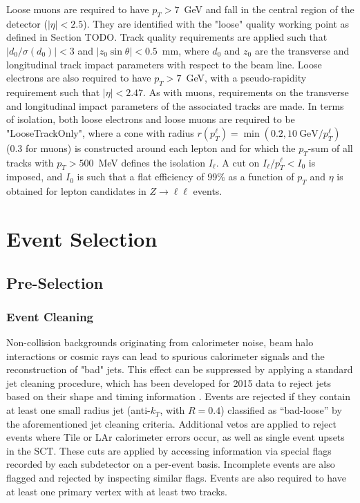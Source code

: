 Loose muons are required to have $p_{T}>7$~GeV and fall in the central region of the detector ($|\eta|<2.5$). They are identified with the "loose" quality working point as defined in Section TODO. Track quality requirements are applied such that $|d_{0}/\sigma(d_{0})|<3$ and $|z_{0}\sin\theta|<0.5$~mm, where $d_{0}$ and $z_{0}$ are the transverse and longitudinal track impact parameters with respect to the beam line. Loose electrons are also required to have $p_{T}>7$~GeV, with a pseudo-rapidity requirement such that $|\eta|<2.47$. As with muons, requirements on the transverse and longitudinal impact parameters of the associated tracks are made. In terms of isolation, both loose electrons and loose muons are required to be "LooseTrackOnly", where a cone with radius $r(p_{T}^{\ell})=\min(0.2,10~\text{GeV}/p_{T}^{\ell})$ (0.3 for muons) is constructed around each lepton and for which the $p_{T}$-sum of all tracks with $p_{T}>500$~MeV defines the isolation $I_\ell$. A cut on $I_\ell/p_{T}^{\ell}<I_{0}$ is imposed, and $I_{0}$ is such that a flat efficiency of 99\% as a function of $p_{T}$ and $\eta$ is obtained for lepton candidates in $Z\rightarrow \ell \ell$ events.

\section{Event Selection}

\subsection{Pre-Selection}
\label{subsec:presel}

\subsubsection{Event Cleaning}
Non-collision backgrounds originating from calorimeter noise, beam halo interactions or cosmic rays can lead to spurious calorimeter signals and the reconstruction of "bad" jets. This effect can be suppressed by applying a standard jet cleaning procedure, which has been developed for 2015 data to reject jets based on their shape and timing information \cite{jetSelection} . Events are rejected if they contain at least one small radius jet (anti-$k_T$, with $R=0.4$) classified as ``bad-loose'' by the aforementioned jet cleaning criteria.
Additional vetos are applied to reject events where Tile or LAr calorimeter errors occur, as well as single event upsets in the SCT. These cuts are applied by accessing information via special flags recorded by each subdetector on a per-event basis. Incomplete events are also flagged and rejected by inspecting similar flags.
Events are also required to have at least one primary vertex with at least two tracks.

